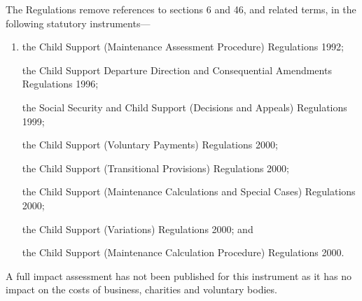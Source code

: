 \documentclass[12pt,a4paper]{article}
\begin{document}
The Regulations remove references to sections 6 and 46, and related terms, in the following statutory instruments—
\begin{enumerate}\item[]
    the Child Support (Maintenance Assessment Procedure) Regulations 1992;

    the Child Support Departure Direction and Consequential Amendments Regulations 1996;

    the Social Security and Child Support (Decisions and Appeals) Regulations 1999;

    the Child Support (Voluntary Payments) Regulations 2000;

    the Child Support (Transitional Provisions) Regulations 2000;

    the Child Support (Maintenance Calculations and Special Cases) Regulations 2000;

    the Child Support (Variations) Regulations 2000; and

    the Child Support (Maintenance Calculation Procedure) Regulations 2000. 
\end{enumerate}

A full impact assessment has not been published for this instrument as it has no impact on the costs of business, charities and voluntary bodies. 
\end{document}
